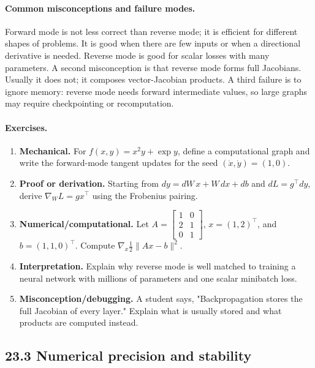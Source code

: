 \paragraph{Common misconceptions and failure modes.}
Forward mode is not less correct than reverse mode; it is efficient for different shapes of problems. It is good when there are few inputs or when a directional derivative is needed. Reverse mode is good for scalar losses with many parameters. A second misconception is that reverse mode forms full Jacobians. Usually it does not; it composes vector-Jacobian products. A third failure is to ignore memory: reverse mode needs forward intermediate values, so large graphs may require checkpointing or recomputation.

\paragraph{Exercises.}
\begin{enumerate}[label=\textbf{23.2.\arabic*.}, leftmargin=*]
\item \textbf{Mechanical.} For \(f(x,y)=x^2y+\exp y\), define a computational graph and write the forward-mode tangent updates for the seed \((\dot x,\dot y)=(1,0)\).
\item \textbf{Proof or derivation.} Starting from \(dy=dW\,x+W\,dx+db\) and \(dL=g^\top dy\), derive \(\nabla_W L=gx^\top\) using the Frobenius pairing.
\item \textbf{Numerical/computational.} Let \(A=\begin{bmatrix}1&0\\2&1\\0&1\end{bmatrix}\), \(x=(1,2)^\top\), and \(b=(1,1,0)^\top\). Compute \(\nabla_x \frac12\|Ax-b\|^2\).
\item \textbf{Interpretation.} Explain why reverse mode is well matched to training a neural network with millions of parameters and one scalar minibatch loss.
\item \textbf{Misconception/debugging.} A student says, "Backpropagation stores the full Jacobian of every layer." Explain what is usually stored and what products are computed instead.
\end{enumerate}

\subsection{23.3 Numerical precision and stability}

